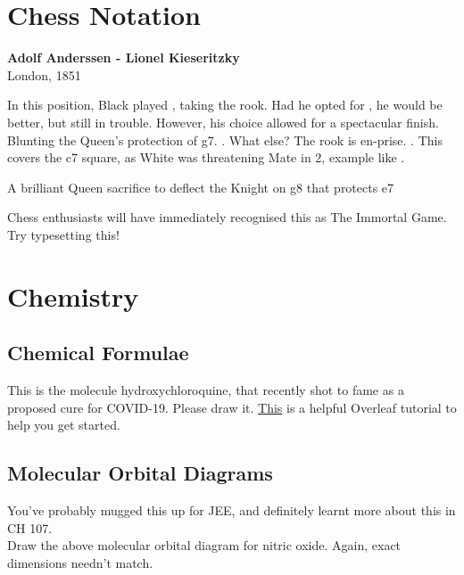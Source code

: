 \documentclass{knittingpattern}
\begin{document}
\section{Chess Notation}
\newgame
{}
\begin{center}
\textbf{Adolf Anderssen - Lionel Kieseritzky}\\London, 1851
\end{center}
\begin{center}
\showboard
\end{center}
In this position, Black played , taking the rook. Had he opted for , he would be better, but still in trouble. However, his choice allowed for a spectacular finish.  Blunting the Queen’s protection of g7.  . What else? The rook is en-prise. . This covers the c7 square, as White was threatening Mate in 2, example like  .  
\begin{center}
\showboard
\end{center}
A brilliant Queen sacrifice to deflect the Knight on g8 that protects e7 
\begin{center}
\showboard
\end{center}
Chess enthusiasts will have immediately recognised this as The Immortal Game.
Try typesetting this!
\section{Chemistry}
\subsection{Chemical Formulae}
\begin{center}
\end{center}
This is the molecule hydroxychloroquine, that recently shot to fame as a proposed cure for COVID-19. Please draw it.
\href{https://www.overleaf.com/learn/latex/chemistry_formulae}{This} is a helpful Overleaf tutorial to help you get started.
\subsection{Molecular Orbital Diagrams}
\begin{center}
    \begin{modiagram}
     \end{modiagram}
\end{center}
You’ve probably mugged this up for JEE, and definitely learnt more about this in CH 107.\\[5pt]
Draw the above molecular orbital diagram for nitric oxide.
Again, exact dimensions needn’t match.
\newpage
\end{document}
